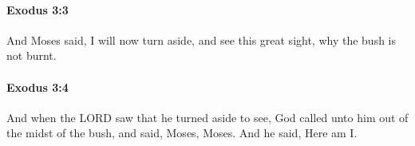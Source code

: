 		\paragraph{Exodus 3:3} %
			\label{EXODUS-3-3}

			And Moses said, I will now turn aside, and see this great sight, why the bush is not burnt.


		\paragraph{Exodus 3:4} %
			\label{EXODUS-3-4}

			And when the LORD saw that he turned aside to see, God called unto him out of the midst of the bush, and said, Moses, Moses. And he said, Here am I.


